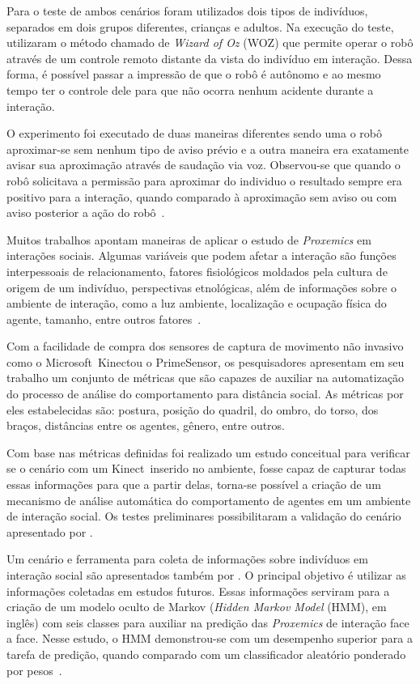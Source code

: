 Para o teste de ambos cenários foram utilizados dois tipos de indivíduos, separados em dois grupos diferentes, crianças e adultos. Na execução do teste,  utilizaram o método chamado de \emph{Wizard of Oz} (WOZ) que permite operar o robô através de um controle remoto distante da vista do indivíduo em interação. Dessa forma, é possível passar a impressão de que o robô é autônomo e ao mesmo tempo ter o controle dele para que não ocorra nenhum acidente durante a interação.

O experimento foi executado de duas maneiras diferentes sendo uma o robô aproximar-se sem nenhum tipo de aviso prévio e a outra maneira era exatamente avisar sua aproximação através de saudação via voz. Observou-se que quando o robô solicitava a permissão para aproximar do individuo o resultado sempre era positivo para a interação, quando comparado à aproximação sem aviso ou com aviso posterior a ação do robô~\cite{Okita:2012}.

Muitos trabalhos apontam maneiras de aplicar o estudo de \emph{Proxemics} em interações sociais. Algumas variáveis que podem afetar a interação são funções interpessoais de relacionamento, fatores fisiológicos moldados pela cultura de origem de um indivíduo, perspectivas etnológicas, além de informações sobre o ambiente de interação, como a luz ambiente, localização e ocupação física do agente, tamanho, entre outros fatores~\cite{Mead:2011b}.

Com a facilidade de compra dos sensores de captura de movimento não invasivo como o Microsoft\textregistered\ Kinect\textregistered ou o PrimeSensor\textregistered, os pesquisadores  apresentam em seu trabalho um conjunto de métricas que são capazes de auxiliar na automatização do processo de análise do comportamento para distância social. As métricas por eles estabelecidas são: postura, posição do quadril, do ombro, do torso, dos braços, distâncias entre os agentes, gênero, entre outros.

Com base nas métricas definidas foi realizado um estudo conceitual para verificar se o cenário com um Kinect\textregistered\ inserido no ambiente, fosse capaz de capturar todas essas informações para que a partir delas, torna-se possível a criação de um mecanismo de análise automática do comportamento de agentes em um ambiente de interação social. Os testes preliminares possibilitaram a validação do cenário apresentado por .

Um cenário e ferramenta para coleta de informações sobre indivíduos em interação social são apresentados também por . O principal objetivo é utilizar as informações coletadas em estudos futuros. Essas informações serviram para a criação de um modelo oculto de Markov (\emph{Hidden Markov Model} (HMM), em inglês) com seis classes para auxiliar na predição das \emph{Proxemics} de interação face a face. Nesse estudo, o HMM demonstrou-se com um desempenho superior para a tarefa de predição, quando comparado com um classificador aleatório ponderado por pesos~\cite{Mead:2011}.

